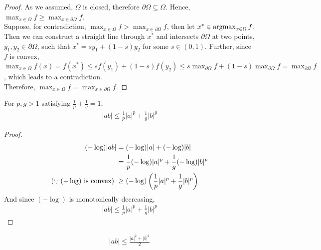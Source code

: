 \documentclass{article}
\begin{document}
    \begin{proof}
        As we assumed, $\Omega$ is closed, therefore $\partial \Omega \subseteq \Omega$. Hence, $\max_{x \in \Omega} f \geq \max_{x \in \partial \Omega} f$.\\
        Suppose, for contradiction, $\max_{x \in \Omega} f > \max_{x \in \partial \Omega} f$, then let $x^* \in \operatorname*{argmax}_{x \in \Omega} f$. \\
        Then we can construct a straight line through $x^*$ and intersects $\partial \Omega$ at two points, $y_1, y_2 \in \partial \Omega$, such that $x^* = s y_1 + (1-s) y_2$ for some $s \in (0, 1)$. Further, since $f$ is convex, $\max_{x \in \Omega}f(x) = f(x^*) \leq s f(y_1) + (1-s) f(y_2) \leq s \max_{\partial \Omega} f + (1-s) \max_{\partial \Omega} f = \max_{\partial \Omega} f$, which leads to a contradiction.\\
        Therefore, $\max_{x \in \Omega} f = \max_{x \in \partial \Omega} f$.
    \end{proof}
    
    \begin{proposition}
    	For $p, g > 1$ satisfying $\frac{1}{p} + \frac{1}{g} = 1$,
    	\begin{align}
    		|ab| \leq \frac{1}{p} |a|^p + \frac{1}{g}|b|^g
    	\end{align}
    \end{proposition}
    
    \begin{proof}
    	\begin{align}
    		(-\log) |ab| &= (-\log) |a| + (-\log) |b| \\
    		&= \frac{1}{p} (-\log) |a|^p + \frac{1}{g} (-\log) |b|^p \\
    		(\because (-\log) \text{{ is convex}})\ &\geq (-\log)\left( \frac{1}{p} |a|^p + \frac{1}{g} |b|^p \right)
    	\end{align}
    	And since $(-\log)$ is monotonically decreasing,
    	\begin{align}
    		|ab| \leq \frac{1}{p} |a|^p + \frac{1}{g} |b|^p
    	\end{align}
    \end{proof}
    
    \begin{corollary}
    	\begin{align}
    		|ab| \leq \frac{|a|^2 + |b|^2}{2}
    	\end{align}
    \end{corollary}
	
\end{document}
